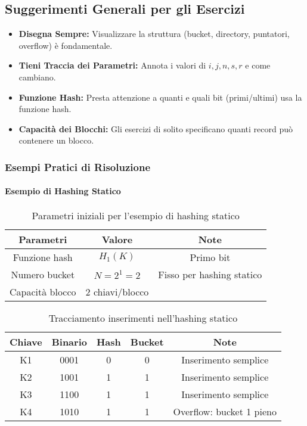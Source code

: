 \subsection{Suggerimenti Generali per gli Esercizi}
\begin{itemize}
    \item \textbf{Disegna Sempre:} Visualizzare la struttura (bucket, directory, puntatori, overflow) è fondamentale.
    \item \textbf{Tieni Traccia dei Parametri:} Annota i valori di $i, j, n, s, r$ e come cambiano.
    \item \textbf{Funzione Hash:} Presta attenzione a quanti e quali bit (primi/ultimi) usa la funzione hash.
    \item \textbf{Capacità dei Blocchi:} Gli esercizi di solito specificano quanti record può contenere un blocco.
\end{itemize}

\subsubsection{Esempi Pratici di Risoluzione}

\paragraph{Esempio di Hashing Statico}
\begin{table}[h]
\centering
\begin{tabular}{|c|c|c|}
\hline
\textbf{Parametri} & \textbf{Valore} & \textbf{Note} \\
\hline
Funzione hash & $H_1(K)$ & Primo bit \\
\hline
Numero bucket & $N = 2^1 = 2$ & Fisso per hashing statico \\
\hline
Capacità blocco & 2 chiavi/blocco & \\
\hline
\end{tabular}
\caption{Parametri iniziali per l'esempio di hashing statico}
\end{table}

\begin{table}[h]
\centering
\begin{tabular}{|c|c|c|c|c|}
\hline
\textbf{Chiave} & \textbf{Binario} & \textbf{Hash} & \textbf{Bucket} & \textbf{Note} \\
\hline
K1 & 0001 & 0 & 0 & Inserimento semplice \\
\hline
K2 & 1001 & 1 & 1 & Inserimento semplice \\
\hline
K3 & 1100 & 1 & 1 & Inserimento semplice \\
\hline
K4 & 1010 & 1 & 1 & Overflow: bucket 1 pieno \\
\hline
\end{tabular}
\caption{Tracciamento inserimenti nell'hashing statico}
\end{table}

